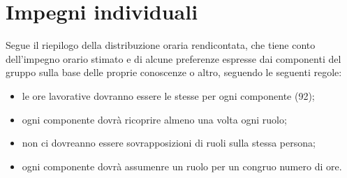


\section{Impegni individuali}
 Segue il riepilogo della distribuzione oraria rendicontata, che tiene conto dell'impegno orario stimato e di alcune preferenze espresse dai componenti del gruppo sulla base delle proprie conoscenze o altro, seguendo le seguenti regole:
    \begin{itemize}
        \item le ore lavorative dovranno essere le stesse per ogni componente (92);
        \item ogni componente dovrà ricoprire almeno una volta ogni ruolo;
        \item non ci dovreanno essere sovrapposizioni di ruoli sulla stessa persona;
        \item ogni componente dovrà assumenre un ruolo per un congruo numero di ore.
        
    \end{itemize}

